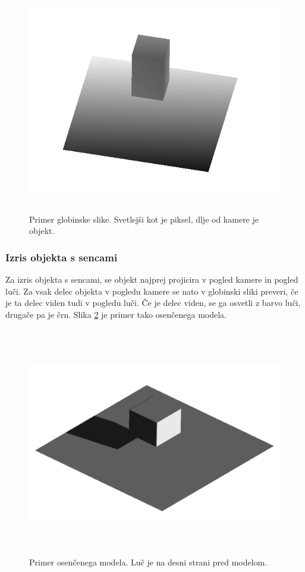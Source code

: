 \documentclass[a4paper, 12pt]{book}
\begin{document}
\begin{figure}[h]
\begin{center}
\includegraphics[width=\textwidth, height=10cm, keepaspectratio=true]{Globinska_slika.png}
\end{center}
\caption{Primer globinske slike. Svetlejši kot je piksel, dlje od kamere je objekt.}
\label{globinskaslika}
\end{figure}

\subsubsection*{Izris objekta s sencami}
Za izris objekta s sencami, se objekt najprej projicira v pogled kamere in pogled luči. Za vsak delec objekta v pogledu kamere se nato v globinski sliki preveri, če je ta delec viden tudi v pogledu luči. Če je delec viden, se ga osvetli z barvo luči, drugače pa je črn. Slika \ref{osencenmodel} je primer tako osenčenega modela.

\begin{figure}[h]
\begin{center}
\includegraphics[width=\textwidth, height=10cm, keepaspectratio=true]{Osencen_model.png}
\end{center}
\caption{Primer osenčenega modela. Luč je na desni strani pred modelom.}
\label{osencenmodel}
\end{figure}
\end{document}
